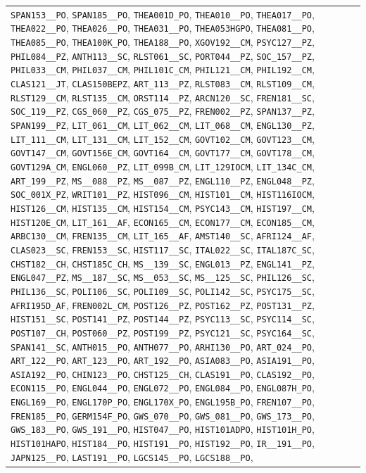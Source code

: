 \begin{longtable}{|p{4.4in}|p{4.4in}|}
\verb|SPAN153__PO|, \verb|SPAN185__PO|, \verb|THEA001D_PO|, \verb|THEA010__PO|, \verb|THEA017__PO|, \verb|THEA022__PO|, \verb|THEA026__PO|, \verb|THEA031__PO|, \verb|THEA053HGPO|, \verb|THEA081__PO|, \verb|THEA085__PO|, \verb|THEA100K_PO|, \verb|THEA188__PO|, \verb|XGOV192__CM|, \verb|PSYC127__PZ|, \verb|PHIL084__PZ|, \verb|ANTH113__SC|, \verb|RLST061__SC|, \verb|PORT044__PZ|, \verb|SOC_157__PZ|, \verb|PHIL033__CM|, \verb|PHIL037__CM|, \verb|PHIL101C_CM|, \verb|PHIL121__CM|, \verb|PHIL192__CM|, \verb|CLAS121__JT|, \verb|CLAS150BEPZ|, \verb|ART_113__PZ|, \verb|RLST083__CM|, \verb|RLST109__CM|, \verb|RLST129__CM|, \verb|RLST135__CM|, \verb|ORST114__PZ|, \verb|ARCN120__SC|, \verb|FREN181__SC|, \verb|SOC_119__PZ|, \verb|CGS_060__PZ|, \verb|CGS_075__PZ|, \verb|FREN002__PZ|, \verb|SPAN137__PZ|, \verb|SPAN199__PZ|, \verb|LIT_061__CM|, \verb|LIT_062__CM|, \verb|LIT_068__CM|, \verb|ENGL130__PZ|, \verb|LIT_111__CM|, \verb|LIT_131__CM|, \verb|LIT_152__CM|, \verb|GOVT102__CM|, \verb|GOVT123__CM|, \verb|GOVT147__CM|, \verb|GOVT156E_CM|, \verb|GOVT164__CM|, \verb|GOVT177__CM|, \verb|GOVT178__CM|, \verb|GOVT129A_CM|, \verb|ENGL060__PZ|, \verb|LIT_099B_CM|, \verb|LIT_129IOCM|, \verb|LIT_134C_CM|, \verb|ART_199__PZ|, \verb|MS__088__PZ|, \verb|MS__087__PZ|, \verb|ENGL110__PZ|, \verb|ENGL048__PZ|, \verb|SOC_001X_PZ|, \verb|WRIT101__PZ|, \verb|HIST096__CM|, \verb|HIST101__CM|, \verb|HIST116IOCM|, \verb|HIST126__CM|, \verb|HIST135__CM|, \verb|HIST154__CM|, \verb|PSYC143__CM|, \verb|HIST197__CM|, \verb|HIST120E_CM|, \verb|LIT_161__AF|, \verb|ECON165__CM|, \verb|ECON177__CM|, \verb|ECON185__CM|, \verb|ARBC130__CM|, \verb|FREN135__CM|, \verb|LIT_165__AF|, \verb|AMST140__SC|, \verb|AFRI124__AF|, \verb|CLAS023__SC|, \verb|FREN153__SC|, \verb|HIST117__SC|, \verb|ITAL022__SC|, \verb|ITAL187C_SC|, \verb|CHST182__CH|, \verb|CHST185C_CH|, \verb|MS__139__SC|, \verb|ENGL013__PZ|, \verb|ENGL141__PZ|, \verb|ENGL047__PZ|, \verb|MS__187__SC|, \verb|MS__053__SC|, \verb|MS__125__SC|, \verb|PHIL126__SC|, \verb|PHIL136__SC|, \verb|POLI106__SC|, \verb|POLI109__SC|, \verb|POLI142__SC|, \verb|PSYC175__SC|, \verb|AFRI195D_AF|, \verb|FREN002L_CM|, \verb|POST126__PZ|, \verb|POST162__PZ|, \verb|POST131__PZ|, \verb|HIST151__SC|, \verb|POST141__PZ|, \verb|POST144__PZ|, \verb|PSYC113__SC|, \verb|PSYC114__SC|, \verb|POST107__CH|, \verb|POST060__PZ|, \verb|POST199__PZ|, \verb|PSYC121__SC|, \verb|PSYC164__SC|, \verb|SPAN141__SC|, \verb|ANTH015__PO|, \verb|ANTH077__PO|, \verb|ARHI130__PO|, \verb|ART_024__PO|, \verb|ART_122__PO|, \verb|ART_123__PO|, \verb|ART_192__PO|, \verb|ASIA083__PO|, \verb|ASIA191__PO|, \verb|ASIA192__PO|, \verb|CHIN123__PO|, \verb|CHST125__CH|, \verb|CLAS191__PO|, \verb|CLAS192__PO|, \verb|ECON115__PO|, \verb|ENGL044__PO|, \verb|ENGL072__PO|, \verb|ENGL084__PO|, \verb|ENGL087H_PO|, \verb|ENGL169__PO|, \verb|ENGL170P_PO|, \verb|ENGL170X_PO|, \verb|ENGL195B_PO|, \verb|FREN107__PO|, \verb|FREN185__PO|, \verb|GERM154F_PO|, \verb|GWS_070__PO|, \verb|GWS_081__PO|, \verb|GWS_173__PO|, \verb|GWS_183__PO|, \verb|GWS_191__PO|, \verb|HIST047__PO|, \verb|HIST101ADPO|, \verb|HIST101H_PO|, \verb|HIST101HAPO|, \verb|HIST184__PO|, \verb|HIST191__PO|, \verb|HIST192__PO|, \verb|IR__191__PO|, \verb|JAPN125__PO|, \verb|LAST191__PO|, \verb|LGCS145__PO|, \verb|LGCS188__PO|, 
\end{longtable}
